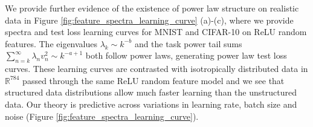\documentclass{article} %
\def\x{\bm x}
\def\w{\bm w}
\def\x{\mathbf x}
\def\w{\mathbf w}
\def\u{\mathbf u}
\begin{document}
We provide further evidence of the existence of power law structure on realistic data in Figure \ref{fig:feature_spectra_learning_curve} (a)-(c), where we provide spectra and test loss learning curves for MNIST and CIFAR-10 on ReLU random features. The eigenvalues $\lambda_k \sim k^{-b}$ and the task power tail sums $\sum_{n=k}^\infty \lambda_n v_n^2 \sim k^{-a+1}$ both follow power laws, generating power law test loss curves. These learning curves are contrasted with isotropically distributed data in $\mathbb{R}^{784}$ passed through the same ReLU random feature model and we see that structured data distributions allow much faster learning than the unstructured data. Our theory is predictive across variations in learning rate, batch size and noise (Figure \ref{fig:feature_spectra_learning_curve}).







\end{document}
